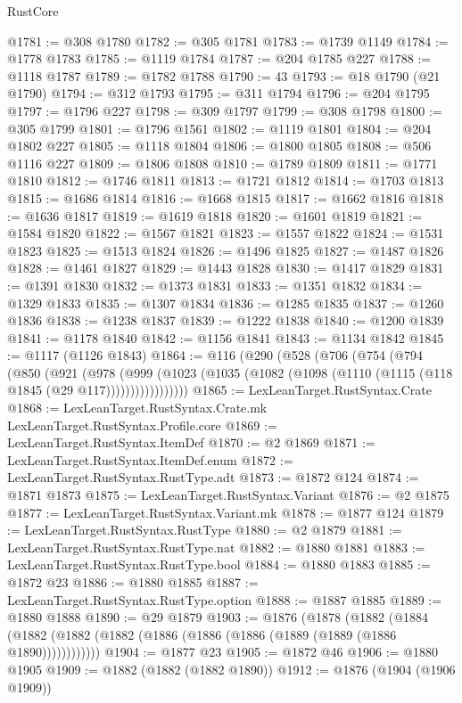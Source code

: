 \begin{lexlean}{RustCore}
\begin{coremodule}
@1781 := @308 @1780
@1782 := @305 @1781
@1783 := @1739 @1149
@1784 := @1778 @1783
@1785 := @1119 @1784
@1787 := @204 @1785 @227
@1788 := @1118 @1787
@1789 := @1782 @1788
@1790 := 43
@1793 := @18 @1790 (@21 @1790)
@1794 := @312 @1793
@1795 := @311 @1794
@1796 := @204 @1795
@1797 := @1796 @227
@1798 := @309 @1797
@1799 := @308 @1798
@1800 := @305 @1799
@1801 := @1796 @1561
@1802 := @1119 @1801
@1804 := @204 @1802 @227
@1805 := @1118 @1804
@1806 := @1800 @1805
@1808 := @506 @1116 @227
@1809 := @1806 @1808
@1810 := @1789 @1809
@1811 := @1771 @1810
@1812 := @1746 @1811
@1813 := @1721 @1812
@1814 := @1703 @1813
@1815 := @1686 @1814
@1816 := @1668 @1815
@1817 := @1662 @1816
@1818 := @1636 @1817
@1819 := @1619 @1818
@1820 := @1601 @1819
@1821 := @1584 @1820
@1822 := @1567 @1821
@1823 := @1557 @1822
@1824 := @1531 @1823
@1825 := @1513 @1824
@1826 := @1496 @1825
@1827 := @1487 @1826
@1828 := @1461 @1827
@1829 := @1443 @1828
@1830 := @1417 @1829
@1831 := @1391 @1830
@1832 := @1373 @1831
@1833 := @1351 @1832
@1834 := @1329 @1833
@1835 := @1307 @1834
@1836 := @1285 @1835
@1837 := @1260 @1836
@1838 := @1238 @1837
@1839 := @1222 @1838
@1840 := @1200 @1839
@1841 := @1178 @1840
@1842 := @1156 @1841
@1843 := @1134 @1842
@1845 := @1117 (@1126 @1843)
@1864 := @116
    (@290
      (@528
        (@706
          (@754
            (@794
              (@850
                (@921
                  (@978
                    (@999
                      (@1023
                        (@1035 (@1082 (@1098 (@1110 (@1115 (@118 @1845 (@29 @117)))))))))))))))))
@1865 := LexLeanTarget.RustSyntax.Crate
@1868 := LexLeanTarget.RustSyntax.Crate.mk LexLeanTarget.RustSyntax.Profile.core
@1869 := LexLeanTarget.RustSyntax.ItemDef
@1870 := @2 @1869
@1871 := LexLeanTarget.RustSyntax.ItemDef.enum
@1872 := LexLeanTarget.RustSyntax.RustType.adt
@1873 := @1872 @124
@1874 := @1871 @1873
@1875 := LexLeanTarget.RustSyntax.Variant
@1876 := @2 @1875
@1877 := LexLeanTarget.RustSyntax.Variant.mk
@1878 := @1877 @124
@1879 := LexLeanTarget.RustSyntax.RustType
@1880 := @2 @1879
@1881 := LexLeanTarget.RustSyntax.RustType.nat
@1882 := @1880 @1881
@1883 := LexLeanTarget.RustSyntax.RustType.bool
@1884 := @1880 @1883
@1885 := @1872 @23
@1886 := @1880 @1885
@1887 := LexLeanTarget.RustSyntax.RustType.option
@1888 := @1887 @1885
@1889 := @1880 @1888
@1890 := @29 @1879
@1903 := @1876
    (@1878
      (@1882 (@1884 (@1882 (@1882 (@1882 (@1886 (@1886 (@1886 (@1889 (@1889 (@1886 @1890))))))))))))
@1904 := @1877 @23
@1905 := @1872 @46
@1906 := @1880 @1905
@1909 := @1882 (@1882 (@1882 @1890))
@1912 := @1876 (@1904 (@1906 @1909))

\end{coremodule}
\end{lexlean}
